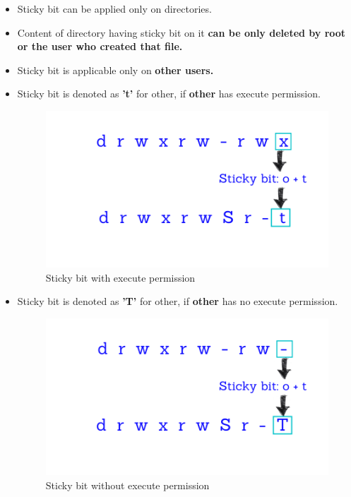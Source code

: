 \setlength{\columnsep}{3pt}
\begin{flushleft}
	\bigskip
	\begin{itemize}
		\item Sticky bit can be applied only on directories.
		\item Content of directory having sticky bit on it \textbf{can be only deleted by root or the user who created that file.}
		\item Sticky bit is applicable only on \textbf{other users.} 
		\item Sticky bit is denoted as \textbf{'t'} for other, if \textbf{other} has execute permission.
		\begin{figure}[h!]
			\centering
			\includegraphics[scale=0.4]{content/chapter6/images/22.png}
			\caption{Sticky bit with execute permission}
			\label{fig:acl_example_9}
		\end{figure}
		\item Sticky bit is denoted as \textbf{'T'} for other, if \textbf{other} has no execute permission.
		\begin{figure}[h!]
			\centering
			\includegraphics[scale=0.4]{content/chapter6/images/23.png}
			\caption{Sticky bit without execute permission}
			\label{fig:acl_example_8}
		\end{figure}
		

\end{itemize}
\end{flushleft}

